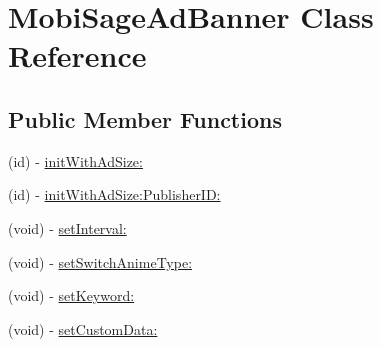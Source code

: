 \hypertarget{interface_mobi_sage_ad_banner}{\section{\-Mobi\-Sage\-Ad\-Banner \-Class \-Reference}
\label{interface_mobi_sage_ad_banner}
}
\subsection*{\-Public \-Member \-Functions}
\begin{DoxyCompactItemize}
\item 
(id) -\/ \hyperlink{interface_mobi_sage_ad_banner_a57636ce4fb5c56896c1863805daf51bc}{init\-With\-Ad\-Size\-:}
\item 
(id) -\/ \hyperlink{interface_mobi_sage_ad_banner_a3eb6d3cd15a6218aa62e2536cf4ddca7}{init\-With\-Ad\-Size\-:\-Publisher\-I\-D\-:}
\item 
(void) -\/ \hyperlink{interface_mobi_sage_ad_banner_ad1c79828bd9ba5934234144c24ddec75}{set\-Interval\-:}
\item 
(void) -\/ \hyperlink{interface_mobi_sage_ad_banner_ad6a2661aaa5f9a9934bb1a124e906f40}{set\-Switch\-Anime\-Type\-:}
\item 
(void) -\/ \hyperlink{interface_mobi_sage_ad_banner_af3349af7b54c107badd872850213abb8}{set\-Keyword\-:}
\item 
(void) -\/ \hyperlink{interface_mobi_sage_ad_banner_a5df6ca2c64c7f49d8461502be4ea1cee}{set\-Custom\-Data\-:}
\end{DoxyCompactItemize}


